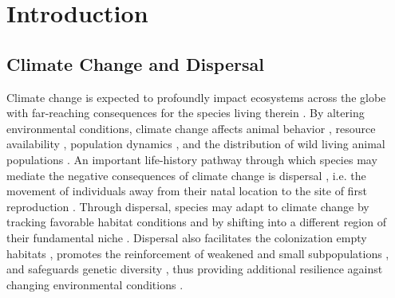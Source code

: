 \documentclass[abstract=on,10pt,a4paper,bibliography=totocnumbered]{article}
\begin{document}
\newpage

\onehalfspacing
\tableofcontents
\doublespacing

\newpage
{}


\section{Introduction}
\subsection{Climate Change and Dispersal}
Climate change is expected to profoundly impact ecosystems across the globe with
far-reaching consequences for the species living therein \citep{Ozgul.2010,
 Radchuk.2019, IPCC.2022}. By altering environmental conditions, climate change
affects animal behavior \citep{Fuller.2016}, resource availability
\citep{Durant.2007}, population dynamics \citep{Paniw.2021}, and the
distribution of wild living animal populations \citep{Thomas.2004,
 Thuiller.2006}. An important life-history pathway through which species may
mediate the negative consequences of climate change is dispersal
\citep{Anderson.2012}, i.e. the movement of individuals away from their natal
location to the site of first reproduction \citep{Clobert.2012}. Through
dispersal, species may adapt to climate change by tracking favorable habitat
conditions \citep{Raia.2012} and by shifting into a different region of their
fundamental niche \citep{Kokko.2006}. Dispersal also facilitates the
colonization empty habitats \citep{Gustafson.1996, Hanski.1999a,
 MacArthur.2001}, promotes the reinforcement of weakened and small subpopulations
\citep{Brown.1977}, and safeguards genetic diversity \citep{Frankham.2002,
 Leigh.2012, Baguette.2013}, thus providing additional resilience against
changing environmental conditions \citep{Kokko.2006, Fahrig.2003}.
\end{document}
